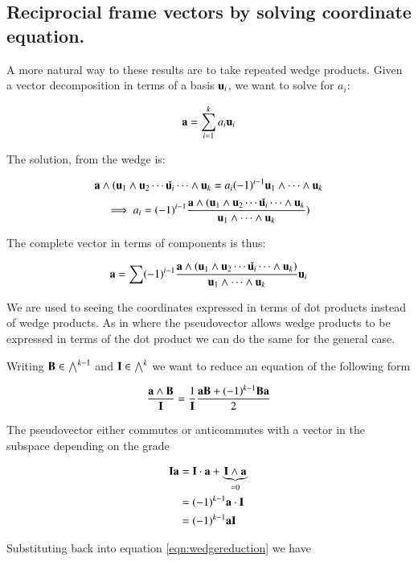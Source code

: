 \documentclass{article}      %
\begin{document}
\subsection{ Reciprocial frame vectors by solving coordinate equation. }

A more natural way to these results are to take repeated wedge products.
Given a vector decomposition in terms of a basis ${\mathbf{u}_i}$, we want to solve for $a_i$:

\[
\mathbf{a} = \sum_{i=1}^k a_i \mathbf{u}_i
\]

The solution, from the wedge is:

\[
\mathbf{a} \wedge (\mathbf{u}_1 \wedge \mathbf{u}_2 \cdots \check{\mathbf{u}_i} \cdots \wedge \mathbf{u}_k  = a_i (-1)^{i-1} \mathbf{u}_1 \wedge \cdots \wedge \mathbf{u}_k
\]
\[
\implies
a_i = 
(-1)^{i-1} 
\frac{\mathbf{a} \wedge (\mathbf{u}_1 \wedge \mathbf{u}_2 \cdots \check{\mathbf{u}_i} \cdots \wedge \mathbf{u}_k}{ \mathbf{u}_1 \wedge \cdots \wedge \mathbf{u}_k })
\]

The complete vector in terms of components is thus:

\begin{equation}\label{eqn:coordinateswedge}
\mathbf{a} =
\sum(-1)^{i-1} 
\frac{\mathbf{a} \wedge \left(\mathbf{u}_1 \wedge \mathbf{u}_2 \cdots \check{\mathbf{u}_i} \cdots \wedge \mathbf{u}_k\right)}{ \mathbf{u}_1 \wedge \cdots \wedge \mathbf{u}_k } \mathbf{u}_i
\end{equation}

We are used to seeing the coordinates expressed in terms of dot products instead of wedge products.  As in  where
the pseudovector allows wedge products to be expressed in terms of the dot product we can do the same for the general case.

Writing $\mathbf{B} \in \bigwedge^{k-1}$ and $\mathbf{I} \in \bigwedge^k$ we want to reduce an equation of the following form

\begin{equation}\label{eqn:wedgereduction}
\frac{\mathbf{a} \wedge \mathbf{B}}{\mathbf{I}} = \frac{1}{\mathbf{I}} \frac{\mathbf{a}\mathbf{B} + (-1)^{k-1}\mathbf{B}\mathbf{a}}{2}
\end{equation}

The pseudovector either commutes or anticommutes with a vector in the subspace depending on the grade

\begin{align*}
\mathbf{I} \mathbf{a} 
&= \mathbf{I} \cdot \mathbf{a} + \underbrace{\mathbf{I} \wedge \mathbf{a}}_{=0} \\
&= (-1)^{k-1}\mathbf{a} \cdot \mathbf{I} \\
&= (-1)^{k-1}\mathbf{a} \mathbf{I} \\
\end{align*}

Substituting back into equation \ref{eqn:wedgereduction} we have
\end{document}
